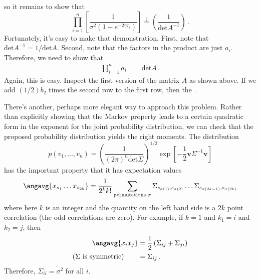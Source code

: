 so it remains to show that
\begin{equation*}
  \prod_{i=1}^n \left[ \frac{1}{\sigma^2 \left( 1 - e^{-2\gamma \tau_i } \right)} \right]
  \stackrel{?}{=}
  \left( \frac{1}{\text{det}A^{-1}} \right)
  \, .
\end{equation*}
Fortunately, it's easy to make that demonstration.
First, note that $\text{det}A^{-1} = 1 / \text{det}A$.
Second, note that the factors in the product are just $a_i$.
Therefore, we need to show that
\begin{align*}
  \prod_{i=1}^n a_i &= \text{det} A
  \, .
\end{align*}
Again, this is easy.
Inspect the first version of the matrix $A$ as shown above.
If we add $(1/2) b_2$ times the second row to the first row, then the .

There's another, perhaps more elegant way to approach this problem.
Rather than explicitly showing that the Markov property leads to a certain quadratic form in the exponent for the joint probability distribution, we can check that the proposed probability distribution yields the right moments.
The distribution
\begin{equation*}
  p(v_1,\ldots,v_n) = \left( \frac{1}{(2\pi)^n \text{det}\Sigma}\right)^{1/2}
  \exp \left[ - \frac{1}{2} \mathbf{v}\Sigma^{-1} \mathbf{v} \right]
\end{equation*}
has the important property that it has expectation values
\begin{equation*}
  \angavg{x_{s_1} \ldots x_{s_{2k}}} = \frac{1}{2^k k!} \sum_{\text{permutations } \sigma}
  \Sigma_{s_{\sigma(1)}, s_{\sigma(2)}} \ldots \Sigma_{s_{\sigma(2k-1)}, s_{\sigma(2k)}}
\end{equation*}
where here $k$ is an integer and the quantity on the left hand side is a $2k$ point correlation (the odd correlations are zero).
For example, if $k=1$ and $k_1 = i$ and $k_2 = j$, then
\begin{align*}
  \angavg{x_i x_j}
  &= \frac{1}{2} \left( \Sigma_{ij} + \Sigma_{ji} \right) \\
  \text{($\Sigma$ is symmetric)} \qquad &= \Sigma_{ij}
  \, .
\end{align*}
Therefore, $\Sigma_{ii} = \sigma^2$ for all $i$.
